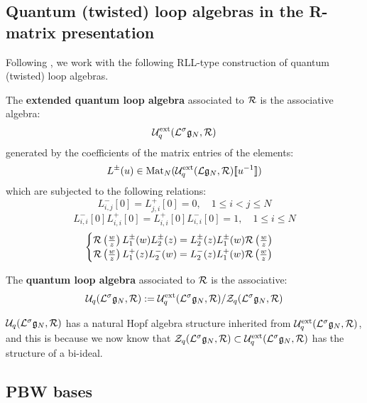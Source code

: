     \subsection{Quantum (twisted) loop algebras in the R-matrix presentation}
        Following \cite{guay_regelskis_wendlandt_R_matrix_presentation_of_quantum_loop_algebras}, we work with the following RLL-type construction of quantum (twisted) loop algebras.
        \begin{definition} \label{def: extended_quantum_loop_algebras}
            The \textbf{extended quantum loop algebra} associated to $\mathcal{R}$ is the associative algebra:
                $$\mathcal{U}_q^{\mathrm{ext}}(\mathcal{L}^{\sigma}\mathfrak{g}_N, \mathcal{R})$$
            generated by the coefficients of the matrix entries of the elements:
                $$L^{\pm}(u) \in \operatorname{Mat}_N( \mathcal{U}_q^{\mathrm{ext}}(\mathcal{L}\mathfrak{g}_N, \mathcal{R})[\![u^{-1}]\!] )$$
            which are subjected to the following relations:
                $$L_{i, j}^-[0] = L_{j, i}^+[0] = 0, \quad 1 \leq i < j \leq N$$
                $$L_{i, i}^-[0] L_{i, i}^+[0] = L_{i, i}^+[0] L_{i, i}^-[0] = 1, \quad 1 \leq i \leq N$$
                $$
                    \begin{cases}
                        \mathcal{R}\left(\frac{w}{z}\right) L_1^{\pm}(w) L_2^{\pm}(z) = L_2^{\pm}(z) L_1^{\pm}(w) \mathcal{R}\left(\frac{w}{z}\right)
                        \\
                        \mathcal{R}\left(\frac{w}{z}\right) L_1^+(z) L_2^-(w) = L_2^-(z) L_1^+(w) \mathcal{R}\left(\frac{w}{z}\right)
                    \end{cases}
                $$
        \end{definition}



        \begin{definition} \label{def: quantum_loop_algebras}
            The \textbf{quantum loop algebra} associated to $\mathcal{R}$ is the associative:
                $$\mathcal{U}_q(\mathcal{L}^{\sigma}\mathfrak{g}_N, \mathcal{R}) := \mathcal{U}_q^{\mathrm{ext}}(\mathcal{L}^{\sigma}\mathfrak{g}_N, \mathcal{R})/\mathcal{Z}_q(\mathcal{L}^{\sigma}\mathfrak{g}_N, \mathcal{R})$$
        \end{definition}
        \begin{remark}
            $\mathcal{U}_q(\mathcal{L}^{\sigma}\mathfrak{g}_N, \mathcal{R})$ has a natural Hopf algebra structure inherited from $\mathcal{U}_q^{\mathrm{ext}}(\mathcal{L}^{\sigma}\mathfrak{g}_N, \mathcal{R})$, and this is because we now know that $\mathcal{Z}_q(\mathcal{L}^{\sigma}\mathfrak{g}_N, \mathcal{R}) \subset \mathcal{U}_q^{\mathrm{ext}}(\mathcal{L}^{\sigma}\mathfrak{g}_N, \mathcal{R})$ has the structure of a bi-ideal.
        \end{remark}

    \subsection{PBW bases}